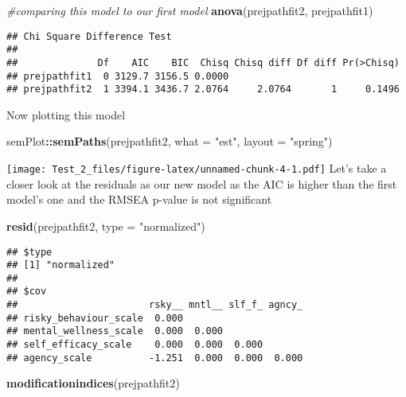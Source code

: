 \documentclass[9pt,]{article}
\newenvironment{Shaded}{\begin{snugshade}}{\end{snugshade}}
\newcommand{\KeywordTok}[1]{\textcolor[rgb]{0.13,0.29,0.53}{\textbf{#1}}}
\newcommand{\DataTypeTok}[1]{\textcolor[rgb]{0.13,0.29,0.53}{#1}}
\newcommand{\StringTok}[1]{\textcolor[rgb]{0.31,0.60,0.02}{#1}}
\newcommand{\CommentTok}[1]{\textcolor[rgb]{0.56,0.35,0.01}{\textit{#1}}}
\newcommand{\OperatorTok}[1]{\textcolor[rgb]{0.81,0.36,0.00}{\textbf{#1}}}
\newcommand{\NormalTok}[1]{#1}
\begin{document}
\begin{Shaded}
\begin{Highlighting}[]
\CommentTok{#comparing this model to our first model}
\KeywordTok{anova}\NormalTok{(prejpathfit2, prejpathfit1) }
\end{Highlighting}
\end{Shaded}

\begin{verbatim}
## Chi Square Difference Test
## 
##              Df    AIC    BIC  Chisq Chisq diff Df diff Pr(>Chisq)
## prejpathfit1  0 3129.7 3156.5 0.0000                              
## prejpathfit2  1 3394.1 3436.7 2.0764     2.0764       1     0.1496
\end{verbatim}

Now plotting this model

\begin{Shaded}
\begin{Highlighting}[]
\NormalTok{semPlot}\OperatorTok{::}\KeywordTok{semPaths}\NormalTok{(prejpathfit2, }\DataTypeTok{what =} \StringTok{"est"}\NormalTok{, }\DataTypeTok{layout =} \StringTok{"spring"}\NormalTok{)}
\end{Highlighting}
\end{Shaded}

\texttt{[image: Test\_2\_files/figure-latex/unnamed-chunk-4-1.pdf]} Let's
take a closer look at the residuals as our new model as the AIC is
higher than the first model's one and the RMSEA p-value is not
significant

\begin{Shaded}
\begin{Highlighting}[]
      \KeywordTok{resid}\NormalTok{(prejpathfit2, }\DataTypeTok{type =} \StringTok{"normalized"}\NormalTok{)}
\end{Highlighting}
\end{Shaded}

\begin{verbatim}
## $type
## [1] "normalized"
## 
## $cov
##                       rsky__ mntl__ slf_f_ agncy_
## risky_behaviour_scale  0.000                     
## mental_wellness_scale  0.000  0.000              
## self_efficacy_scale    0.000  0.000  0.000       
## agency_scale          -1.251  0.000  0.000  0.000
\end{verbatim}

\begin{Shaded}
\begin{Highlighting}[]
      \KeywordTok{modificationindices}\NormalTok{(prejpathfit2)}
\end{Highlighting}
\end{Shaded}
\end{document}
